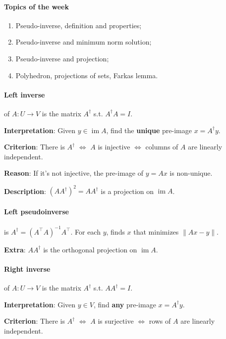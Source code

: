 \documentclass{article}
\begin{document}
\paragraph{Topics of the week} 

\begin{enumerate}
    \item Pseudo-inverse, definition and properties;
    \item Pseudo-inverse and minimum norm solution;
    \item Pseudo-inverse and projection;
    \item Polyhedron, projections of sets, Farkas lemma.
\end{enumerate}

\paragraph{Left inverse} of $A : U \to V$ is the matrix $A^\dagger$ s.t. $A^\dagger A = I$.

\textbf{Interpretation}: Given $y \in \operatorname{im} A$, find the \textbf{unique} pre-image $x = A^\dagger y$.

\textbf{Criterion}: There is $A^\dagger$ $\iff$ $A$ is injective $\iff$ columns of $A$ are linearly independent.

\textbf{Reason}: If it's not injective, the pre-image of $y=Ax$ is non-unique.

\textbf{Description}: $(AA^\dagger)^2 = AA^\dagger$ is a projection on $\operatorname{im} A$.

\paragraph{Left pseudoinverse} is $A^\dagger = (A^\top A)^{-1} A^\top$. For each $y$, finds $x$ that minimizes $\|Ax-y\|$.

\textbf{Extra}: $A A^\dagger$ is the orthogonal projection on $\operatorname{im} A$.

\paragraph{Right inverse} of $A : U \to V$ is the matrix $A^\dagger$ s.t. $AA^\dagger = I$.

\textbf{Interpretation}: Given $y \in V$, find \textbf{any} pre-image $x = A^\dagger y$.

\textbf{Criterion}: There is $A^\dagger$ $\iff$ $A$ is surjective $\iff$ rows of $A$ are linearly independent.
\end{document}
